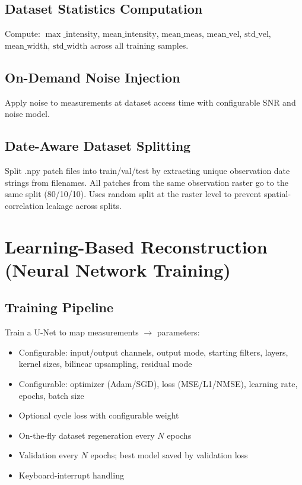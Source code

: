 \documentclass[11pt,a4paper]{article}
\begin{document}
\subsection{Dataset Statistics Computation}
Compute: $\max\_\text{intensity}$, $\text{mean\_intensity}$, $\text{mean\_meas}$, $\text{mean\_vel}$, $\text{std\_vel}$, $\text{mean\_width}$, $\text{std\_width}$ across all training samples.

\subsection{On-Demand Noise Injection}
Apply noise to measurements at dataset access time with configurable SNR and noise model.

\subsection{Date-Aware Dataset Splitting}
Split .npy patch files into train/val/test by extracting unique observation date strings from filenames. All patches from the same observation raster go to the same split (80/10/10). Uses random split at the raster level to prevent spatial-correlation leakage across splits.

\section{Learning-Based Reconstruction (Neural Network Training)}

\subsection{Training Pipeline}
Train a U-Net to map measurements $\rightarrow$ parameters:
\begin{itemize}[nosep]
  \item Configurable: input/output channels, output mode, starting filters, layers, kernel sizes, bilinear upsampling, residual mode
  \item Configurable: optimizer (Adam/SGD), loss (MSE/L1/NMSE), learning rate, epochs, batch size
  \item Optional cycle loss with configurable weight
  \item On-the-fly dataset regeneration every $N$ epochs
  \item Validation every $N$ epochs; best model saved by validation loss
  \item Keyboard-interrupt handling
\end{itemize}
\end{document}
